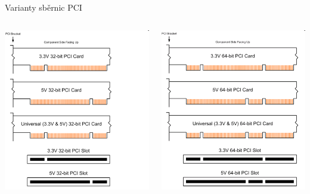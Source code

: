 \documentclass[aspectratio=43]{beamer}
\begin{document}
\begin{frame}{Varianty sběrnic PCI}
	\begin{columns}
        \begin{center}
            \includegraphics[width=1\linewidth]{extrahovane_obrazky/img_1_page12_1.png}
        \end{center}
        \begin{center}
            \includegraphics[width=1\linewidth]{extrahovane_obrazky/img_1_page12_2.png}

\end{center}
\end{columns}
\end{frame}
\end{document}

